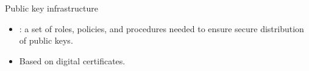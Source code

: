 \begin{frame}{Public key infrastructure}

\begin{itemize}
\item {}: a set of roles, policies, and procedures needed to
ensure
secure distribution of public keys.
\item Based on digital certificates.
\end{itemize}



%

\end{frame}


